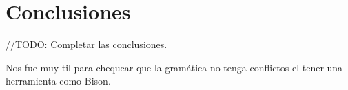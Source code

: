 \section{Conclusiones}

//TODO: Completar las conclusiones. 

Nos fue muy til para chequear que la gramática no tenga conflictos el tener una herramienta como Bison. 
